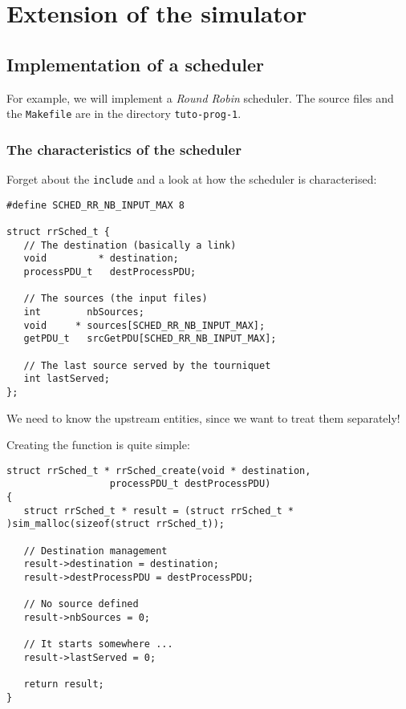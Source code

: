 %
\section{Extension of the simulator}
\label{section:extension}


%
\subsection{Implementation of a scheduler}
\label{subsection:tut-ordo}

   For example, we will implement a {\em Round
Robin} scheduler. The source files and the {\tt Makefile} are in the directory {\tt tuto-prog-1}.

%
\subsubsection{The characteristics of the scheduler}

   Forget about the {\tt include} and a look at how the
scheduler is characterised:
  
\begin{verbatim}
#define SCHED_RR_NB_INPUT_MAX 8

struct rrSched_t {
   // The destination (basically a link)
   void         * destination;
   processPDU_t   destProcessPDU;

   // The sources (the input files)
   int        nbSources;
   void     * sources[SCHED_RR_NB_INPUT_MAX];
   getPDU_t   srcGetPDU[SCHED_RR_NB_INPUT_MAX];

   // The last source served by the tourniquet
   int lastServed;
};
\end{verbatim}

    We need to know the upstream entities, since we want to
treat them separately!

    Creating the function is quite simple:

\begin{verbatim}
struct rrSched_t * rrSched_create(void * destination,
				  processPDU_t destProcessPDU)
{
   struct rrSched_t * result = (struct rrSched_t * )sim_malloc(sizeof(struct rrSched_t));

   // Destination management
   result->destination = destination;
   result->destProcessPDU = destProcessPDU;

   // No source defined
   result->nbSources = 0;

   // It starts somewhere ...
   result->lastServed = 0;

   return result;
}
\end{verbatim}

